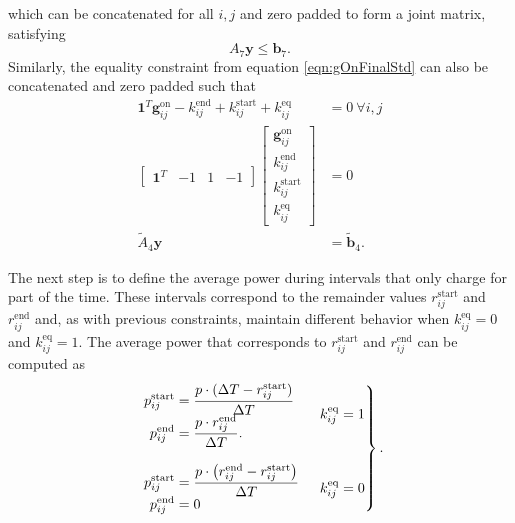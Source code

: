 which can be concatenated for all $i,j$ and zero padded to form a joint matrix, satisfying 
\begin{equation}
	A_7\mathbf{y} \le \mathbf{b}_7.
\end{equation}
Similarly, the equality constraint from equation \ref{eqn:gOnFinalStd} can also be concatenated and zero padded such that
\begin{equation} \begin{aligned}
	\mathbf{1}^T\mathbf{g}_{ij}^{\text{on}} - k_{ij}^{\text{end}} + k_{ij}^{\text{start}} + k_{ij}^{\text{eq}} &= 0 \ \forall i,j\\
	\begin{bmatrix}\mathbf{1}^T & - 1 & 1 & -1\end{bmatrix} \begin{bmatrix}\mathbf{g}_{ij}^{\text{on}} \\ k_{ij}^{\text{end}} \\ k_{ij}^{\text{start}} \\ k_{ij}^{\text{eq}} \end{bmatrix} &= 0 \\
		\tilde{A}_4\mathbf{y} &= \tilde{\mathbf{b}}_4.
\end{aligned} \end{equation}
	\par The next step is to define the average power during intervals that only charge for part of the time.  These intervals correspond to the remainder values $r_{ij}^{\text{start}}$ and $r_{ij}^{\text{end}}$ and, as with previous constraints, maintain different behavior when $k_{ij}^{\text{eq}} = 0$ and $k_{ij}^{\text{eq}} = 1$. The average power that corresponds to $r_{ij}^{\text{start}}$ and $r_{ij}^{\text{end}}$ can be computed as 
\begin{equation}\label{eqn:avgPower1}\begin{aligned}
	\begin{rcases}
	\begin{array}{l} \begin{aligned}
		p^{\text{start}}_{ij} &= \frac{p\cdot (\Delta T - r^{\text{start}}_{ij})}{\Delta T}\\ 
		p^{\text{end}}_{ij} &= \frac{p\cdot r^{\text{end}}_{ij}}{\Delta T}.\\
	\end{aligned} \end{array} & k_{ij}^{\text{eq}} = 1 \\[8pt] 
	\begin{array}{l} \begin{aligned}
		p_{ij}^{\text{start}} &= \frac{p\cdot \left ( r_{ij}^{\text{end}} - r_{ij}^{\text{start}} \right )}{\Delta T} \\
		p_{ij}^{\text{end}} &= 0 \\
	\end{aligned} \end{array} & k_{ij}^{\text{eq}} = 0 \\
	\end{rcases}.
\end{aligned}\end{equation}
